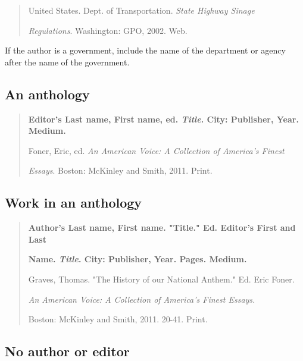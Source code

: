 \begin{quote}

United States. Dept. of Transportation. \emph{State Highway Sinage}

\hspace{.4in} \emph{Regulations}. Washington: GPO, 2002. Web.

\end{quote}
 If the author is a government, include the name of the department or agency after the name of the government.

\subsection{An anthology}
\begin{quote}

\textbf{Editor's Last name, First name, ed. \emph{Title}. City: Publisher, Year. Medium.}

\medskip

Foner, Eric, ed. \emph{An American Voice: A Collection of America's Finest}

\hspace{.4in}\emph{Essays}. Boston: McKinley and Smith, 2011. Print.

\end{quote}

\subsection{Work in an anthology}

\begin{quote}

\textbf{Author's Last name, First name. "Title." Ed. Editor's First and Last}

\hspace{.4in}\textbf{Name. \emph{Title}. City: Publisher, Year. Pages. Medium.}

\medskip

Graves, Thomas. "The History of our National Anthem." Ed. Eric Foner. 

\hspace{.4in}\emph{An American Voice: A Collection of America's Finest Essays.}

\hspace{.4in}Boston: McKinley and Smith, 2011. 20-41. Print.

\end{quote}

\subsection{No author or editor}

